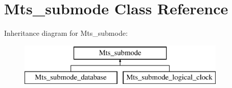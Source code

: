 \hypertarget{classMts__submode}{}\section{Mts\+\_\+submode Class Reference}
\label{classMts__submode}
Inheritance diagram for Mts\+\_\+submode\+:\begin{figure}[H]
\begin{center}
\leavevmode
\includegraphics[height=2.000000cm]{classMts__submode}
\end{center}
\end{figure}
